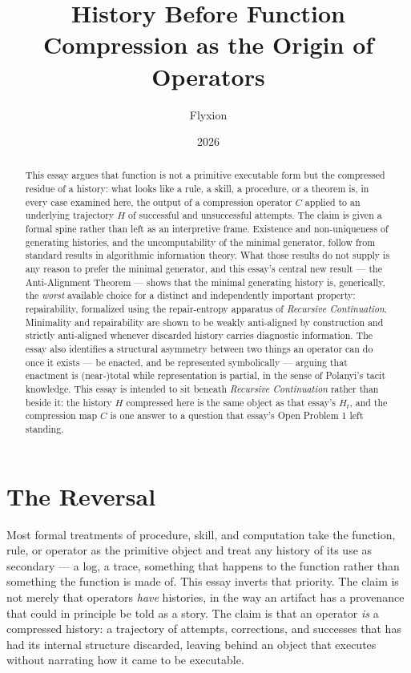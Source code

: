 \documentclass[11pt]{article}
\title{\textbf{History Before Function}\\[4pt]
\large Compression as the Origin of Operators}
\author{Flyxion}
\date{2026}
\begin{document}
\maketitle

\begin{abstract}
This essay argues that function is not a primitive executable form but the compressed residue of a history: what looks like a rule, a skill, a procedure, or a theorem is, in every case examined here, the output of a compression operator $C$ applied to an underlying trajectory $H$ of successful and unsuccessful attempts. The claim is given a formal spine rather than left as an interpretive frame. Existence and non-uniqueness of generating histories, and the uncomputability of the minimal generator, follow from standard results in algorithmic information theory. What those results do not supply is any reason to prefer the minimal generator, and this essay's central new result — the Anti-Alignment Theorem — shows that the minimal generating history is, generically, the \emph{worst} available choice for a distinct and independently important property: repairability, formalized using the repair-entropy apparatus of \emph{Recursive Continuation}. Minimality and repairability are shown to be weakly anti-aligned by construction and strictly anti-aligned whenever discarded history carries diagnostic information. The essay also identifies a structural asymmetry between two things an operator can do once it exists — be enacted, and be represented symbolically — arguing that enactment is (near-)total while representation is partial, in the sense of Polanyi's tacit knowledge. This essay is intended to sit beneath \emph{Recursive Continuation} rather than beside it: the history $H$ compressed here is the same object as that essay's $H_t$, and the compression map $C$ is one answer to a question that essay's Open Problem 1 left standing.
\end{abstract}

\section{The Reversal}

Most formal treatments of procedure, skill, and computation take the function, rule, or operator as the primitive object and treat any history of its use as secondary — a log, a trace, something that happens to the function rather than something the function is made of. This essay inverts that priority. The claim is not merely that operators \emph{have} histories, in the way an artifact has a provenance that could in principle be told as a story. The claim is that an operator \emph{is} a compressed history: a trajectory of attempts, corrections, and successes that has had its internal structure discarded, leaving behind an object that executes without narrating how it came to be executable.
\end{document}
